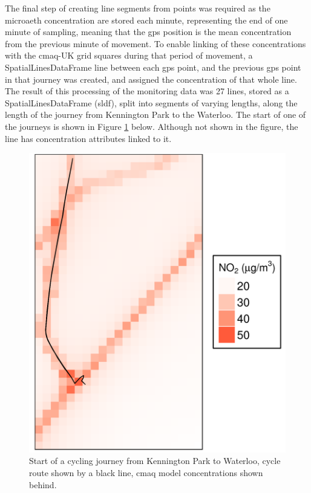 The final step of creating line segments from points was required as the microaeth concentration are stored each minute, representing the end of one minute of sampling, meaning that the \gls{gps} position is the mean concentration from the previous minute of movement. To enable linking of these concentrations with the \gls{cmaq}-UK grid squares during that period of movement, a SpatialLinesDataFrame line between each \gls{gps} point, and the previous \gls{gps} point in that journey was created, and assigned the concentration of that whole line.
The result of this processing of the monitoring data was 27 lines, stored as a SpatialLinesDataFrame (\gls{sldf}), split into segments of varying lengths, along the length of the journey from Kennington Park to the Waterloo. The start of one of the journeys is shown in Figure \ref{fig:cmaq_cycle_route_zoomed} below. Although not shown in the figure, the line has concentration attributes linked to it.

\begin{figure}[H]
\centering
\includegraphics[scale=0.4]{images/cmaq_cycle_route_zoomed.png}
\caption{Start of a cycling journey from Kennington Park to Waterloo, cycle route shown by a black line, \gls{cmaq} model concentrations shown behind.}
\label{fig:cmaq_cycle_route_zoomed}
\end{figure}

